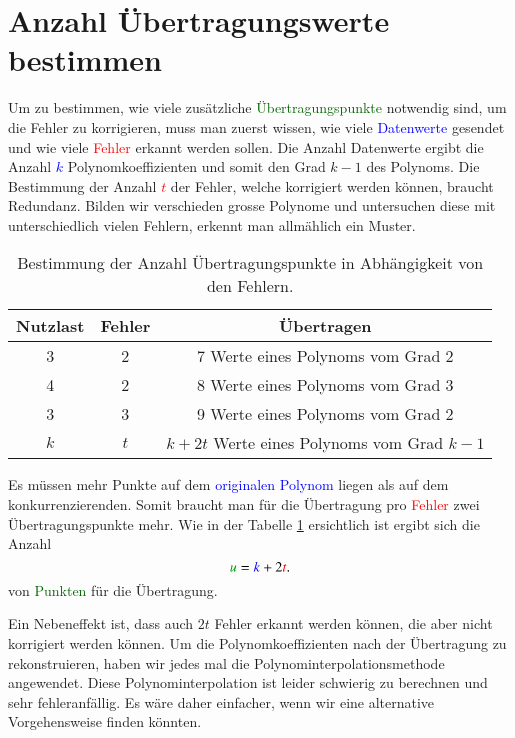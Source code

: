 \section{Anzahl Übertragungswerte bestimmen
\label{reedsolomon:section:Fehlerkorrekturstellen}}
Um zu bestimmen, wie viele zusätzliche \textcolor{darkgreen}{Übertragungspunkte} notwendig sind, um die Fehler zu korrigieren,
    muss man zuerst wissen, wie viele \textcolor{blue}{Datenwerte} gesendet und wie viele \textcolor{red}{Fehler} erkannt werden sollen. 
Die Anzahl Datenwerte ergibt die Anzahl
\textcolor{blue}{$k$}
Polynomkoeffizienten
und somit den Grad $k-1$ des Polynoms.
Die Bestimmung der Anzahl \textcolor{red}{$t$} der Fehler, welche korrigiert werden können, braucht Redundanz.
Bilden wir verschieden grosse Polynome und untersuchen diese mit unterschiedlich vielen Fehlern, erkennt man allmählich ein Muster.

\begin{table}%
    \centering
    \begin{tabular}{ c c | c} 
        \hline
        Nutzlast & Fehler & Übertragen \\
        \hline 
        3 & 2 & 7 Werte eines Polynoms vom Grad 2 \\ 
        4 & 2 & 8 Werte eines Polynoms vom Grad 3 \\
        3 & 3 & 9 Werte eines Polynoms vom Grad 2 \\ 
        \hline
        $k$ & $t$ & $k+2t$ Werte eines Polynoms vom Grad $k-1$ \\ 
        \hline
    \end{tabular}
    \caption{Bestimmung der Anzahl Übertragungspunkte in Abhängigkeit von den Fehlern.}
    \label{tab:fehlerkorrekturstellen}
\end{table}
\par 
Es müssen mehr Punkte auf dem \textcolor{blue}{originalen Polynom} liegen als auf dem konkurrenzierenden.
Somit braucht man für die Übertragung pro \textcolor{red}{Fehler} zwei Übertragungspunkte mehr.
Wie in der Tabelle \ref{tab:fehlerkorrekturstellen} ersichtlich ist ergibt sich die
Anzahl
\begin{equation}
    \textcolor{darkgreen}{u}=
    \textcolor{blue}{k}+2\textcolor{red}{t}.
    \label{reedsolomon:equation2}
\end{equation}
von \textcolor{darkgreen}{Punkten} für die Übertragung.

Ein Nebeneffekt ist, dass auch $2t$ Fehler erkannt werden können, die aber nicht korrigiert werden können.
Um die Polynomkoeffizienten nach der Übertragung zu rekonstruieren, haben wir jedes mal die Polynominterpolationsmethode angewendet.
Diese Polynominterpolation ist leider schwierig zu berechnen und sehr fehleranfällig.
Es wäre daher einfacher, wenn wir eine alternative Vorgehensweise finden könnten. 


